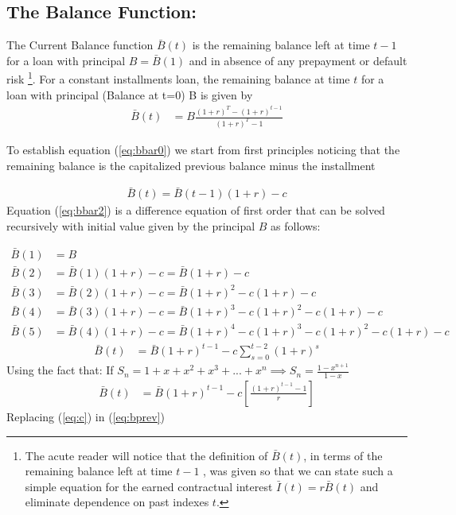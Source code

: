 \subsection{The Balance Function: }
The Current Balance function $\bar{B}(t)$ is the remaining balance left at time $t-1$ for a loan with principal $B=\bar{B}(1)$ and in absence of any prepayment or default risk \footnote{The acute reader will notice that the definition of $\bar{B}(t)$, in terms of the remaining balance left at time $t-1$ , was given so that we can state such a simple equation for the earned contractual interest $\bar{I}(t)=r\bar{B}(t)$ and eliminate dependence on past indexes $t$.}. For a constant installments loan, the remaining balance at time $t$ for a loan with principal (Balance at t=0) B is given by 
\begin{align}
\bar{B}(t)&=B\frac{(1+r)^T-(1+r)^{t-1}}{(1+r)^T-1} \label{eq:bbar0}
\end{align}

To establish equation (\ref{eq:bbar0}) we start from first principles noticing that 
the remaining balance is the capitalized previous balance minus the installment 

\begin{align}
\bar{B}(t)=\bar{B}(t-1)(1+r)-c \label{eq:bbar2}
\end{align}
Equation (\ref{eq:bbar2}) is a difference equation of first order that can be solved recursively with initial value given by the principal $B$ as follows:

\begin{align}
    \bar{B}(1)&=B \nonumber \\
    \bar{B}(2)&=\bar{B}(1)(1+r)-c = \bar{B}(1+r)-c \nonumber \\
    \bar{B}(3)&=\bar{B}(2)(1+r)-c = \bar{B}(1+r)^2-c(1+r)-c \nonumber \\
    \bar{B}(4)&=\bar{B}(3)(1+r)-c = \bar{B}(1+r)^3-c(1+r)^2-c(1+r)-c \nonumber \\
    \bar{B}(5)&=\bar{B}(4)(1+r)-c = \bar{B}(1+r)^4-c(1+r)^3-c(1+r)^2-c(1+r)-c \nonumber 
\end{align}  
\begin{align}
    \bar{B}(t)&= \bar{B}(1+r)^{t-1}-c \sum_{s=0}^{t-2} (1+r)^s 
\end{align}
Using the fact that: If $S_n = 1+x+x^2+x^3+...+x^n \implies  S_n=\frac{1-x^{n+1}}{1-x}$
\begin{align}
    \bar{B}(t)&= \bar{B}(1+r)^{t-1}-c \left[ \frac{(1+r)^{t-1}-1}{r} \right]  \label{eq:bprev}
\end{align}
Replacing (\ref{eq:c}) in (\ref{eq:bprev})

